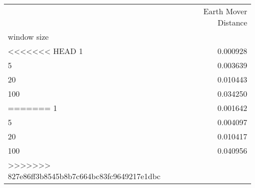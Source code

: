 \begin{tabular}{lr}
\toprule
{} &  Earth Mover Distance \\
window size &                       \\
\midrule
<<<<<<< HEAD
1           &              0.000928 \\
5           &              0.003639 \\
20          &              0.010443 \\
100         &              0.034250 \\
=======
1           &              0.001642 \\
5           &              0.004097 \\
20          &              0.010417 \\
100         &              0.040956 \\
>>>>>>> 827e86ff3b8545b8b7c664bc83fc9649217e1dbc
\bottomrule
\end{tabular}
